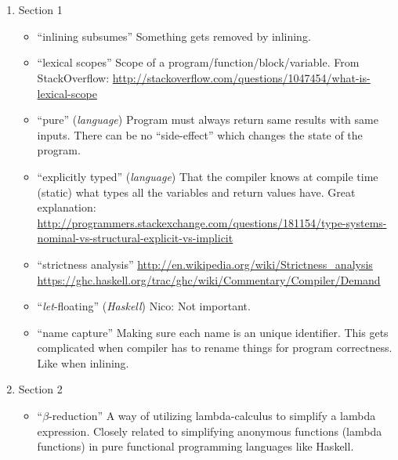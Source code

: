 

\section{\cite{GHCPaper}}
\begin{enumerate}

	\item Section 1
\begin{itemize}

	\item ``inlining subsumes''
Something gets removed by inlining.

	\item ``lexical scopes''
Scope of a program/function/block/variable.
From StackOverflow:
\url{http://stackoverflow.com/questions/1047454/what-is-lexical-scope}

	\item ``pure'' (\textit{language})
Program must always return same results with same inputs. There can be no
``side-effect'' which changes the state of the program.

	\item ``explicitly typed'' (\textit{language})
That the compiler knows at compile time (static) what types all the variables
and return values have.
Great explanation: \url{http://programmers.stackexchange.com/questions/181154/type-systems-nominal-vs-structural-explicit-vs-implicit}

	\item ``strictness analysis''
\url{http://en.wikipedia.org/wiki/Strictness_analysis}
\url{https://ghc.haskell.org/trac/ghc/wiki/Commentary/Compiler/Demand}

	\item ``\textit{let}-floating'' (\textit{Haskell})
Nico: Not important.

	\item ``name capture''
Making sure each name is an unique identifier. This gets complicated when
compiler has to rename things for program correctness. Like when inlining.

\end{itemize}

	\item Section 2
\begin{itemize}

	\item ``\textit{$\beta$}-reduction''
A way of utilizing lambda-calculus to simplify a lambda expression. Closely related to simplifying anonymous functions (lambda functions) in pure functional programming languages like Haskell.


\end{itemize}
\end{enumerate}
